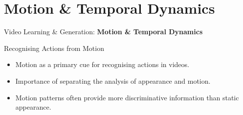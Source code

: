 \section{Motion \& Temporal Dynamics}
\begin{frame}{}
    \LARGE Video Learning \& Generation: \textbf{Motion \& Temporal Dynamics}
\end{frame}

\begin{frame}{Recognising Actions from Motion}
    \begin{itemize}
        \item Motion as a primary cue for recognising actions in videos.
        \item Importance of separating the analysis of appearance and motion.
        \item Motion patterns often provide more discriminative information than static appearance.
    \end{itemize}
\end{frame}








